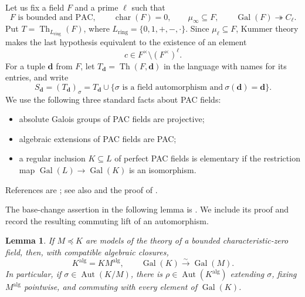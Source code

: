 \documentclass[10pt,a4paper]{amsart}
\newtheorem{lemma}[theorem]{Lemma}
\theoremstyle{definition}
\newcommand{\alg}{\mathrm{alg}}
\newcommand{\bd}{\boldsymbol d}
\DeclareMathOperator{\Gal}{Gal}
\DeclareMathOperator{\Aut}{Aut}
\DeclareMathOperator{\Th}{Th}
\begin{document}
Let us fix a field $F$ and a prime $\ell$ such that
\begin{equation}\label{b:eq:hyp}
F\text{ is bounded and PAC},\qquad
\operatorname{char}(F)=0,\qquad \mu_\infty\subseteq F,
\qquad \Gal(F)\twoheadrightarrow C_\ell.
\end{equation}
Put $T=\Th_{L_{\mathrm{ring}}}(F)$, where
$L_{\mathrm{ring}}=\{0,1,+,-,\cdot\}$. Since $\mu_\ell\subseteq F$,
Kummer theory makes the last hypothesis equivalent to the existence of
an element
\begin{equation}\label{b:eq:c}
c\in F^\times\setminus(F^\times)^\ell.
\end{equation}
For a tuple $\bd$ from $F$, let $T_{\bd}=\Th(F,\bd)$ in the language
with names for its entries, and write
\[
S_{\bd}=(T_{\bd})_\sigma
=T_{\bd}\cup\{\sigma\text{ is a field automorphism and}\ \sigma(\bd)=\bd\}.
\]
We use the following three standard facts about PAC fields:
\begin{itemize}
  \item absolute Galois groups of PAC
fields are projective;
  \item algebraic extensions of PAC fields are PAC;
  \item a regular inclusion $K\subseteq L$ of perfect PAC fields is elementary if the
restriction map $\Gal(L)\to\Gal(K)$ is an isomorphism.
\end{itemize}
References are \cite[Corollary 11.2.5, Theorem 11.6.2, Corollary 20.3.4]{FJ}; see also \cite[Section 4.3]{CP} and the proof of \cite[Theorem 3.25]{HK}.

The base-change assertion in the following lemma is
\cite[Section~1.4, Fact~3]{BCGeometric}.
We include its proof and record the resulting
commuting lift of an automorphism.
\begin{lemma}\label{b:lem:basechange}
If $M\preccurlyeq K$ are models of the theory of a bounded
characteristic-zero field, then, with compatible algebraic closures,
\[
K^{\alg}=KM^{\alg},\qquad
\Gal(K)\xrightarrow{\sim}\Gal(M).
\]
In particular, if $\sigma\in\Aut(K/M)$, there is
$\rho\in\Aut(K^{\alg})$ extending $\sigma$, fixing $M^{\alg}$
pointwise, and commuting with every element of $\Gal(K)$.
\end{lemma}
\end{document}

